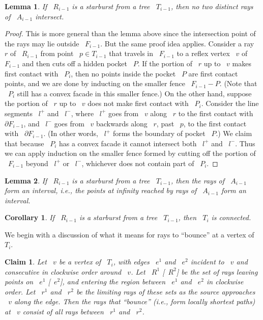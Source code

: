 \documentclass[11pt]{article}
\newtheorem{lemma}{Lemma}
\newtheorem{corollary}{Corollary}
\newtheorem{claim}{Claim}
\begin{document}
\begin{lemma}
\label{lem:no-intersect-Ai}
If ~\(R_{i-1}\) is a starburst from a tree ~\(T_{i-1}\), then no two distinct rays of ~\(A_{i-1}\) intersect.
\end{lemma}

\begin{proof}
This is more general than the lemma above since the intersection point of the rays may lie outside ~\(F_{i-1}\).
But the same proof idea applies.
Consider a ray ~\(r\) of ~\(R_{i-1}\) from point ~\(p \in T_{i-1}\) that travels in ~\(F_{i-1}\) to a reflex vertex ~\(v\) of ~\(F_{i-1}\) and then cuts off a hidden pocket ~\(P\).
If the portion of ~\(r\) up to ~\(v\) makes first contact with ~\(P_i\), then no points inside the pocket ~\(P\) are first contact points, and we are done by inducting on the smaller fence ~\(F_{i-1} - P\).
(Note that ~\(P_i\) still has a convex facade in this smaller fence.)
On the other hand, suppose the portion of ~\(r\) up to ~\(v\) does not make first contact with ~\(P_i\).
Consider the line segments ~\(l^+\) and ~\(l^-\), where ~\(l^+\) goes from ~\(v\) along ~\(r\) to the first contact with ~\(\partial F_{i-1}\), and ~\(l^-\) goes from ~\(v\) backwards along ~\(r\), past ~\(p\), to the first contact with ~\(\partial F_{i-1}\).
(In other words, ~\(l^+\) forms the boundary of pocket ~\(P\).)
We claim that because ~\(P_i\) has a convex facade it cannot intersect both ~\(l^+\) and ~\(l^-\).
Thus we can apply induction on the smaller fence formed by cutting off the portion of ~\(F_{i-1}\) beyond ~\(l^+\) or ~\(l^-\), whichever does not contain part of ~\(P_i\).
\end{proof}

\begin{lemma}
\label{lem:interval}
If ~\(R_{i-1}\) is a starburst from a tree ~\(T_{i-1}\), then the rays of ~\(A_{i-1}\) form an interval, i.e., the points at infinity reached by rays of ~\(A_{i-1}\) form an interval.
\end{lemma}

\begin{corollary}
If ~\(R_{i-1}\) is a starburst from a tree ~\(T_{i-1}\), then ~\(T_i\) is connected.
\end{corollary}

We begin with a discussion of what it means for rays to ``bounce'' at a vertex of ~\(T_i\).

\begin{claim}
Let ~\(v\) be a vertex of ~\(T_i\), with edges ~\(e^1\) and ~\(e^2\) incident to ~\(v\) and consecutive in clockwise order around ~\(v\).
Let ~\(R^1\) [~\(R^2\)] be the set of rays leaving points on ~\(e^1\) [~\(e^2\)], and entering the region between ~\(e^1\) and ~\(e^2\) in clockwise order.
Let ~\(r^1\) and ~\(r^2\) be the limiting rays of these sets as the source approaches ~\(v\) along the edge.
Then the rays that ``bounce'' (i.e., form locally shortest paths) at ~\(v\) consist of all rays between ~\(r^1\) and ~\(r^2\).
\end{claim}
\end{document}
